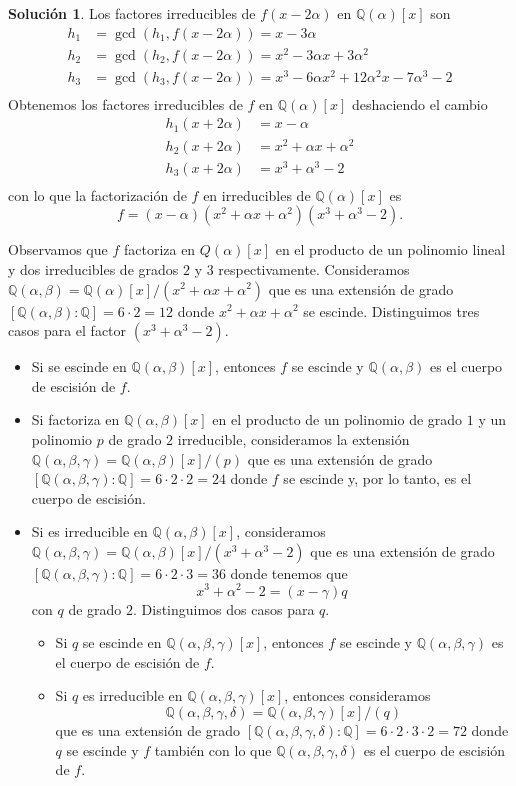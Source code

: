 \documentclass[10pt]{article}
\theoremstyle{definition}
\newtheorem*{sol}{Solución}
\newcommand{\QQ}{\mathbb{Q}}
\newcommand{\QQa}{\mathbb{Q}(\alpha)}
\begin{document}
\begin{sol}
Los factores irreducibles de $f(x-2\alpha)$ en $\QQa[x]$ son
\[\begin{split}
h_1 & = \gcd(h_1,f(x-2\alpha))=x-3\alpha\\
h_2 & = \gcd(h_2,f(x-2\alpha))=x^{2} - 3 \alpha x + 3 \alpha^{2}\\
h_3 & = \gcd(h_3,f(x-2\alpha))=x^{3} - 6 \alpha x^{2} + 12 \alpha^{2} x - 7 \alpha^{3} - 2\\
\end{split}
\]
Obtenemos los factores irreducibles de $f$ en $\QQa[x]$ deshaciendo el cambio
\[\begin{split}
h_1(x+2\alpha) & =x-\alpha\\
h_2(x+2\alpha) & =x^2 + \alpha x + \alpha^2\\
h_3(x+2\alpha) & =x^3 + \alpha^3 - 2\\
\end{split}
\]
con lo que la factorización de $f$ en irreducibles de $\QQa[x]$ es
\[f=\left(x-\alpha\right)\left(x^2 + \alpha x + \alpha^2\right)\left(x^3 + \alpha^3 - 2\right).\]

Observamos que $f$ factoriza en $Q(\alpha)[x]$ en el producto de un polinomio lineal y dos irreducibles de grados $2$ y $3$ respectivamente. Consideramos $\QQ(\alpha,\beta)=\QQ(\alpha)[x]/(x^2+\alpha x+\alpha^2)$ que es una extensión de grado $[\QQ(\alpha,\beta) : \QQ]=6\cdot 2=12$ donde $x^2+\alpha x+\alpha^2$ se escinde. Distinguimos tres casos para el factor $(x^3+\alpha^3-2)$. 
\begin{itemize}
    \item Si se escinde en $\QQ(\alpha,\beta)[x]$, entonces $f$ se escinde y $\QQ(\alpha,\beta)$ es el cuerpo de escisión de $f$.
    \item  Si factoriza en $\QQ(\alpha,\beta)[x]$ en el producto de un polinomio de grado $1$ y un polinomio $p$ de grado $2$ irreducible, consideramos la extensión $\QQ(\alpha,\beta,\gamma)=\QQ(\alpha,\beta)[x]/(p)$ que es una extensión de grado $[\QQ(\alpha,\beta,\gamma) : \QQ]=6\cdot 2\cdot 2 = 24$ donde $f$ se escinde y, por lo tanto, es el cuerpo de escisión.
    \item Si es irreducible en $\QQ(\alpha,\beta)[x]$, consideramos  $\QQ(\alpha,\beta,\gamma)=\QQ(\alpha,\beta)[x]/(x^3+\alpha^3-2)$ que es una extensión de grado $[\QQ(\alpha,\beta,\gamma):\QQ]=6\cdot 2\cdot 3=36$ donde tenemos que \[x^3+\alpha^2-2=(x-\gamma)q\] con $q$ de grado $2$. Distinguimos dos casos para $q$.
    \begin{itemize}
    \item Si $q$ se escinde en $\QQ(\alpha,\beta,\gamma)[x]$, entonces $f$ se escinde y $\QQ(\alpha,\beta,\gamma)$ es el cuerpo de escisión de $f$.
    \item Si $q$ es irreducible en $\QQ(\alpha,\beta,\gamma)[x]$, entonces consideramos \[\QQ(\alpha,\beta,\gamma,\delta)=\QQ(\alpha,\beta,\gamma)[x]/(q)\] que es una extensión de grado $[\QQ(\alpha,\beta,\gamma,\delta):\QQ]=6\cdot 2\cdot 3\cdot 2 = 72$ donde $q$ se escinde y $f$ también con lo que $\QQ(\alpha,\beta,\gamma,\delta)$ es el cuerpo de escisión de $f$.
    \end{itemize}
    

\end{itemize}
\end{sol}
\end{document}
